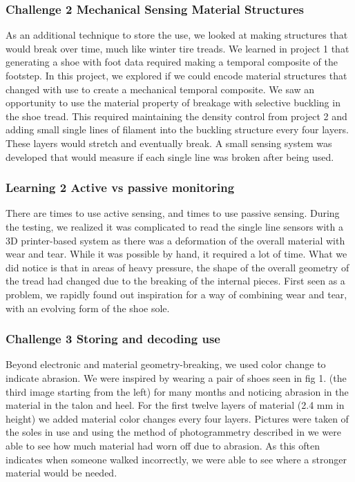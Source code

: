 \subsubsection{Challenge 2 Mechanical Sensing Material Structures}

As an additional technique to store the use, we looked at making structures that would break over time, much like winter tire treads. We learned in project 1 that generating a shoe with foot data required making a temporal composite of the footstep. In this project, we explored if we could encode material structures that changed with use to create a mechanical temporal composite. We saw an opportunity to use the material property of breakage with selective buckling \cite{Paulose2015} in the shoe tread. This required maintaining the density control from project 2 and adding small single lines of filament into the buckling structure every four layers. These layers would stretch and eventually break. A small sensing system was developed that would measure if each single line was broken after being used. 

\subsubsection{Learning 2 Active vs passive monitoring}

There are times to use active sensing, and times to use passive sensing. During the testing, we realized it was complicated to read the single line sensors with a 3D printer-based system as there was a deformation of the overall material with wear and tear. While it was possible by hand, it required a lot of time. What we did notice is that in areas of heavy pressure, the shape of the overall geometry of the tread had changed due to the breaking of the internal pieces. First seen as a problem, we rapidly found out inspiration for a way of combining wear and tear, with an evolving form of the shoe sole.

\subsubsection{Challenge 3 Storing and decoding use}

Beyond electronic and material geometry-breaking, we used color change to indicate abrasion. We were inspired by wearing a pair of shoes seen in fig 1. (the third image starting from the left) for many months and noticing abrasion in the material in the talon and heel. For the first twelve layers of material (2.4 mm in height) we added material color changes every four layers. Pictures were taken of the soles in use and using the method of photogrammetry described in \cite{Nachtigall2017} we were able to see how much material had worn off due to abrasion. As this often indicates when someone walked incorrectly, we were able to see where a stronger material would be needed. 

